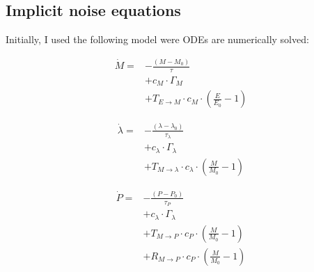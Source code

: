 \documentclass[a4paper,twoside,10pt]{report}
\begin{document}


\subsection{Implicit noise equations}

Initially, I used the following model were ODEs are numerically solved:

\begin{align}
\label{myfirstequation}
\dot{M} = & - \frac{(M-M_0)}{\tau}  \nonumber \\ 
          & + c_M \cdot \Gamma_M  \nonumber \\ %
          & + T_{E\rightarrow M} \cdot c_M \cdot (\frac{E}{E_0} - 1)  
\end{align}


\begin{align}
	\dot{\lambda} = & -\frac{(\lambda - \lambda_0 )}{\tau_\lambda} \nonumber \\ 
 			& + c_\lambda \cdot \Gamma_\lambda \nonumber \\  %
			& +    T_{M\rightarrow\lambda} \cdot c_\lambda \cdot (\frac{M}{M_0}-1) 
\end{align}

\begin{align}
\label{mythirdequation}
\dot{P} = & - \frac{(P-P_0)}{\tau_P} \nonumber \\ 
		 & + c_\lambda \cdot \Gamma_\lambda \nonumber \\ %
         & + T_{M\rightarrow P} \cdot c_P \cdot (\frac{M}{M_0}-1)  \nonumber \\ 
         & + R_{M\rightarrow P} \cdot c_P \cdot (\frac{M}{M_0}-1)
\end{align}
\end{document}
